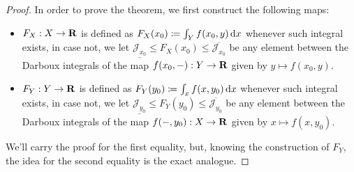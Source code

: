 \begin{proof}
    In order to prove the theorem, we first construct the following maps:
    \begin{itemize}\setlength\itemsep{0em}
        \item \(F_X: X \to \mathbf{R}\) is defined as \(F_{X}(x_0) \coloneq \int_Y f(x_0, y)\,
              \mathrm{d} x\) whenever such integral exists, in case not, we let
              \(\underline{\mathcal{J}_{x_0}} \leq F_{X}(x_0) \leq
              \overline{\mathcal{J}_{x_0}}\) be any element between the Darboux integrals of
              the map \(f(x_{0}, -): Y \to \mathbf{R}\) given by \(y \mapsto f(x_{0}, y)\).

        \item \(F_Y: Y \to \mathbf{R}\) is defined as \(F_{Y}(y_{0}) \coloneq \int_x f(x,
              y_{0})\, \mathrm{d} x\) whenever such integral exists, in case not, we let
              \(\underline{\mathcal{J}_{y_0}} \leq F_{Y}(y_{0}) \leq
              \overline{\mathcal{J}_{y_0}}\) be any element between the Darboux integrals of
              the map \(f(-, y_0): X \to \mathbf{R}\) given by \(x \mapsto f(x, y_{0})\).
    \end{itemize}
    We'll carry the proof for the first equality, but, knowing the construction of
    \(F_Y\), the idea for the second equality is the exact analogue.


\end{proof}
